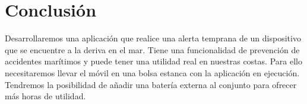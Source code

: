 \section{Conclusión}

Desarrollaremos una aplicación que realice una alerta temprana de un dispositivo que se encuentre a la deriva en el mar. Tiene una funcionalidad de prevención de accidentes marítimos y puede tener una utilidad real en nuestras costas. Para ello necesitaremos llevar el móvil en una bolsa estanca con la aplicación en ejecución. Tendremos la posibilidad de añadir una batería externa al conjunto para ofrecer más horas de utilidad.